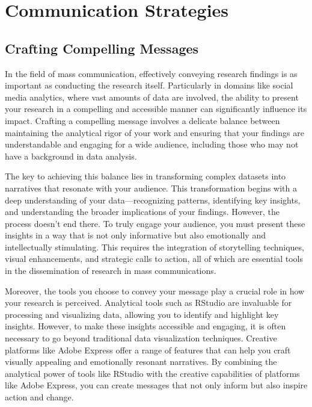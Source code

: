 \documentclass[
]{book}
\begin{document}
\section{Communication Strategies}\label{communication-strategies}

\subsection*{Crafting Compelling Messages}\label{crafting-compelling-messages}

In the field of mass communication, effectively conveying research findings is as important as conducting the research itself. Particularly in domains like social media analytics, where vast amounts of data are involved, the ability to present your research in a compelling and accessible manner can significantly influence its impact. Crafting a compelling message involves a delicate balance between maintaining the analytical rigor of your work and ensuring that your findings are understandable and engaging for a wide audience, including those who may not have a background in data analysis.

The key to achieving this balance lies in transforming complex datasets into narratives that resonate with your audience. This transformation begins with a deep understanding of your data---recognizing patterns, identifying key insights, and understanding the broader implications of your findings. However, the process doesn't end there. To truly engage your audience, you must present these insights in a way that is not only informative but also emotionally and intellectually stimulating. This requires the integration of storytelling techniques, visual enhancements, and strategic calls to action, all of which are essential tools in the dissemination of research in mass communications.

Moreover, the tools you choose to convey your message play a crucial role in how your research is perceived. Analytical tools such as RStudio are invaluable for processing and visualizing data, allowing you to identify and highlight key insights. However, to make these insights accessible and engaging, it is often necessary to go beyond traditional data visualization techniques. Creative platforms like Adobe Express offer a range of features that can help you craft visually appealing and emotionally resonant narratives. By combining the analytical power of tools like RStudio with the creative capabilities of platforms like Adobe Express, you can create messages that not only inform but also inspire action and change.
\end{document}

